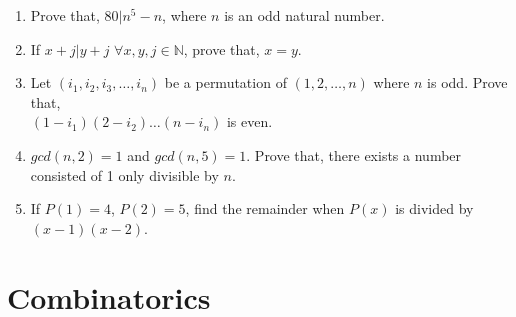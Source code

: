 \documentclass[11pt, a4paper]{article}
\begin{document}
\begin{enumerate}
	\item Prove that, $80 | n^5 - n$, where $n$ is an odd natural number.
	
	\item If $x + j | y + j$  $\forall x, y, j \in \mathbb{N}$, prove that, $x = y$.
	
	\item Let $(i_1, i_2, i_3, \ldots , i_n)$ be a permutation of $(1, 2, \ldots, n)$ where $n$ is odd. Prove that,\\ $(1-i_1)(2-i_2) \ldots (n-i_n)$ is even.
	
	\item $gcd(n, 2) = 1$ and $gcd(n, 5) = 1$. Prove that, there exists a number consisted of 1 only divisible by $n$.
	
	\item If $P(1) = 4$, $P(2) = 5$, find the remainder when $P(x)$ is divided by $(x-1)(x-2)$.
	
\end{enumerate}








\section{Combinatorics}
\end{document}
